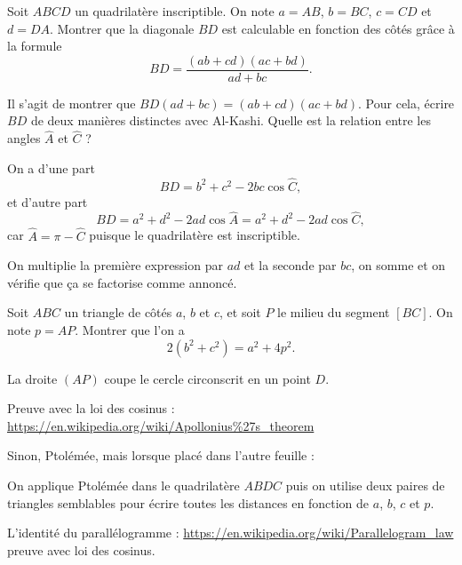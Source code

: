 \begin{exo}
Soit $ABCD$ un quadrilatère inscriptible. On note $a=AB$, $b=BC$, $c=CD$ et $d=DA$.
Montrer que la diagonale $BD$ est calculable en fonction des côtés grâce à la formule
\[ BD = \frac{(ab+cd)(ac+bd)}{ad+bc}.\]
\begin{hint}
Il s'agit de montrer que $BD(ad+bc) = (ab+cd)(ac+bd)$.
Pour cela, écrire  $BD$ de deux manières distinctes avec Al-Kashi. 
Quelle est la relation entre les angles $\widehat A$ et $\widehat C$ ?
\end{hint}
\begin{sol}
On a d'une part 
\[BD  = b^2+c^2-2bc\cos \widehat C,\]
et d'autre part 
\[ BD = a^2+d^2-2ad\cos\widehat A =a^2+d^2-2ad\cos\widehat C, \]
car $\widehat A = \pi - \widehat C$ puisque le quadrilatère est inscriptible.

On multiplie la première expression par $ad$ et la seconde par $bc$, on somme et on vérifie que ça se factorise comme annoncé.
\end{sol}
\end{exo}



\begin{exo}
Soit $ABC$ un triangle de côtés $a$, $b$ et $c$, et soit $P$ le milieu du segment $[BC]$. On note $p=AP$.
Montrer que l'on a 
\[ 2(b^2+c^2)=a^2+4p^2.\]
\begin{hint}
La droite $(AP)$ coupe le cercle circonscrit en un point $D$. 
\end{hint}
\begin{sol}


Preuve avec la loi des cosinus : \url{https://en.wikipedia.org/wiki/Apollonius%27s_theorem}

Sinon, Ptolémée, mais lorsque placé dans l'autre feuille : 

On applique Ptolémée dans le quadrilatère $ABDC$ puis on utilise deux paires de triangles semblables pour écrire toutes les distances en fonction de $a$, $b$, $c$ et $p$.
\end{sol}
\end{exo}


\begin{exo}
L'identité du parallélogramme : \url{https://en.wikipedia.org/wiki/Parallelogram_law} preuve avec loi des cosinus.
\begin{hint}
\end{hint}
\begin{sol}
\end{sol}
\end{exo}




